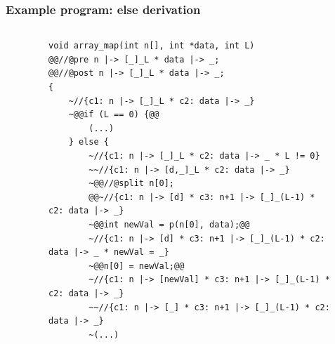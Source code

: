 \documentclass{beamer}
\begin{document}

\begin{frame}[fragile]
\frametitle{Example program: else derivation}
\vspace{-2em}
\begin{columns}
\begin{column}{0.03\textwidth}
\end{column}
\begin{column}{0.97\textwidth}
\begin{figure}[h]
  \centering
\begin{lstlisting}[style=CStyleOverlay, captionpos = t]
void array_map(int n[], int *data, int L)
@@//@pre n |-> [_]_L * data |-> _;
@@//@post n |-> [_]_L * data |-> _;
{
	~//{c1: n |-> [_]_L * c2: data |-> _}
	~@@if (L == 0) {@@
		(...)
	} else {
		~//{c1: n |-> [_]_L * c2: data |-> _ * L != 0}
		~~//{c1: n |-> [d,_]_L * c2: data |-> _}
		~@@//@split n[0];
		@@~//{c1: n |-> [d] * c3: n+1 |-> [_]_(L-1) * c2: data |-> _}
		~@@int newVal = p(n[0], data);@@
		~//{c1: n |-> [d] * c3: n+1 |-> [_]_(L-1) * c2: data |-> _ * newVal = _}
		~@@n[0] = newVal;@@
		~//{c1: n |-> [newVal] * c3: n+1 |-> [_]_(L-1) * c2: data |-> _}
		~~//{c1: n |-> [_] * c3: n+1 |-> [_]_(L-1) * c2: data |-> _}
		~(...)		
\end{lstlisting}
\end{figure}
\end{column}
\end{columns}
\end{frame}
\end{document}
